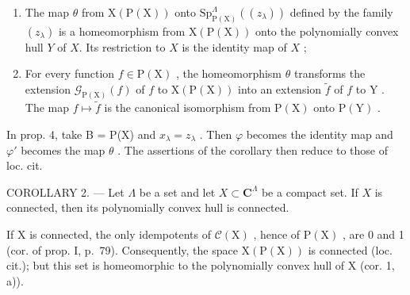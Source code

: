 \begin{enumerate}
\def\labelenumi{\alph{enumi})}
\item
  The map \(\theta\) from \(\mathrm{X}(\mathrm{P}(\mathrm{X}))\) onto \(\mathrm{Sp}_{\mathrm{P}(\mathrm{X})}^{\Lambda}((z_{\lambda}))\) defined by the family \((z_{\lambda})\) is a homeomorphism from \(\mathrm{X}(\mathrm{P}(\mathrm{X}))\) onto the polynomially convex hull \(Y\) of \(X\). Its restriction to \(X\) is the identity map of \(X\) ;
\item
  For every function \(f \in \mathrm{P}(\mathrm{X})\) , the homeomorphism \(\theta\) transforms the extension \(\mathcal{G}_{\mathrm{P}(\mathrm{X})}(f)\) of \(f\) to \(\mathrm{X}(\mathrm{P}(\mathrm{X}))\) into an extension \(\widetilde{f}\) of \(f\) to \(\mathrm{Y}\) . The map \(f \mapsto \widetilde{f}\) is the canonical isomorphism from \(\mathrm{P}(\mathrm{X})\) onto \(\mathrm{P}(\mathrm{Y})\) .
\end{enumerate}

In prop. 4, take B = P(X) and \(x_{\lambda} = z_{\lambda}\) . Then \(\varphi\) becomes the identity map and \(\varphi'\) becomes the map \(\theta\) . The assertions of the corollary then reduce to those of loc. cit.

COROLLARY 2. --- Let \(\Lambda\) be a set and let \(X \subset \mathbf{C}^{\Lambda}\) be a compact set. If \(X\) is connected, then its polynomially convex hull is connected.

If X is connected, the only idempotents of \(\mathcal{C}(\mathrm{X})\) , hence of \(\mathrm{P}(\mathrm{X})\) , are 0 and 1 (cor. of prop. I, p.~79). Consequently, the space \(\mathrm{X}(\mathrm{P}(\mathrm{X}))\) is connected (loc. cit.); but this set is homeomorphic to the polynomially convex hull of X (cor. 1, a)).


